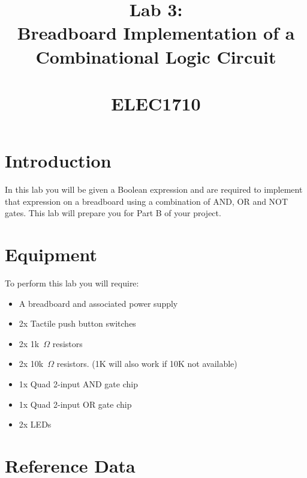 \documentclass{UoNMCHA}
\numberwithin{equation}{section}
\begin{document}
\title{Lab 3:\\Breadboard Implementation of a Combinational Logic Circuit \\ \ \\
{\small ELEC1710    \\ 
}}
\maketitle
\onecolumn

\vspace{-5mm}

\section{Introduction}

In this lab you will be given a Boolean expression and are required to implement that expression on a breadboard using a combination of AND, OR and NOT gates. This lab will prepare you for Part B of your project.

\section{Equipment}

To perform this lab you will require:

\begin{itemize}
    \item A breadboard and associated power supply
    \item 2x Tactile push button switches
    \item 2x 1k~$\Omega$ resistors
    \item 2x 10k~$\Omega$ resistors. (1K will also work if 10K not available)
    \item 1x Quad 2-input AND gate chip
    \item 1x Quad 2-input OR gate chip
    \item 2x LEDs
\end{itemize}

\section{Reference Data}
\end{document}

